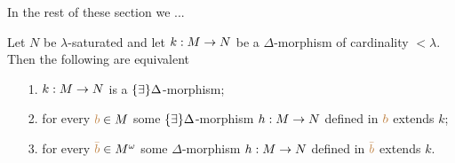 In the rest of these section we ... 

% 

\begin{proposition}\label{prop_EDelta_estensione}
Let $N$ be $\lambda$-saturated and let $k:M\rightarrow N$ be a $\Delta$-morphism of cardinality $<\lambda$. Then the following are equivalent
\begin{itemize}
\item[1.] $k:M\rightarrow N$ is a $\{\exists\}\Delta$-morphism;
\item[2.] for every ${\color{brown} b}\in M$ some $\{\exists\}\Delta$-morphism $h:M\rightarrow N$ defined in ${\color{brown} b}$ extends $k$;
\item[3.] for every ${\color{brown}\bar b}\in M^{\omega}$ some $\Delta$-morphism $h:M\rightarrow N$ defined in ${\color{brown}\bar b}$ extends $k$.
\end{itemize}
\end{proposition}


